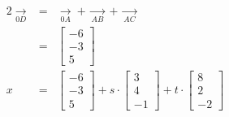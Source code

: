 \documentclass[10pt,a4paper,oneside,ngerman,numbers=noenddot]{scrartcl}
\begin{document}
\subsubsection{} %
\begin{alignat*}{2}
\underset{0D}{\rightarrow} &=&
\underset{0A}{\rightarrow} + \underset{AB}{\rightarrow} + \underset{AC}{\rightarrow} \\
&=& 
\begin{bmatrix}
-6 \\
-3 \\
5
\end{bmatrix} \\
x &=&
\begin{bmatrix}
-6 \\
-3 \\
5
\end{bmatrix} + s \cdot
\begin{bmatrix}
3 \\
4 \\
-1
\end{bmatrix} + t \cdot
\begin{bmatrix}
8 \\
2 \\
-2
\end{bmatrix}
\end{alignat*}
\end{document}
